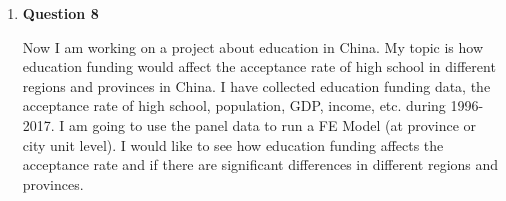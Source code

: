 \documentclass[11pt,a4paper]{article}
\begin{document}
\begin{enumerate}
\begin{description}
          \end{description}    
          
    \item \textbf{Question 8}
		  \begin{description}

Now I am working on a project about education in China. My topic is how education funding would affect the acceptance rate of high school in different regions and provinces in China. I have collected education funding data, the acceptance rate of high school, population, GDP, income, etc. during 1996-2017. I am going to use the panel data to run a FE Model (at province or city unit level). I would like to see how education funding affects the acceptance rate and if there are significant differences in different regions and provinces.
 
          \end{description} 

          
\end{enumerate}
\end{document}
